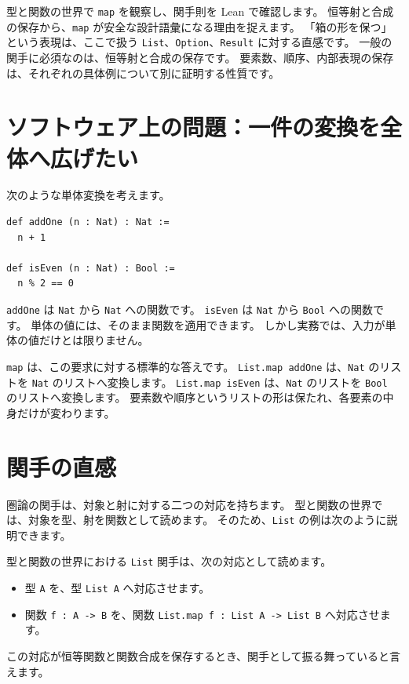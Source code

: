 型と関数の世界で \texttt{map} を観察し、関手則を Lean で確認します。
恒等射と合成の保存から、\texttt{map} が安全な設計語彙になる理由を捉えます。
「箱の形を保つ」という表現は、ここで扱う \texttt{List}、\texttt{Option}、\texttt{Result} に対する直感です。
一般の関手に必須なのは、恒等射と合成の保存です。
要素数、順序、内部表現の保存は、それぞれの具体例について別に証明する性質です。

\section{ソフトウェア上の問題：一件の変換を全体へ広げたい}

次のような単体変換を考えます。

\begin{listing}[htbp]
\begin{verbatim}
def addOne (n : Nat) : Nat :=
  n + 1

def isEven (n : Nat) : Bool :=
  n % 2 == 0
\end{verbatim}
\caption{\texttt{addOne} と \texttt{isEven}}
\label{lst:ch14_single_functions}
\end{listing}

\texttt{addOne} は \texttt{Nat} から \texttt{Nat} への関数です。
\texttt{isEven} は \texttt{Nat} から \texttt{Bool} への関数です。
単体の値には、そのまま関数を適用できます。
しかし実務では、入力が単体の値だけとは限りません。

\texttt{map} は、この要求に対する標準的な答えです。
\texttt{List.map addOne} は、\texttt{Nat} のリストを \texttt{Nat} のリストへ変換します。
\texttt{List.map isEven} は、\texttt{Nat} のリストを \texttt{Bool} のリストへ変換します。
要素数や順序というリストの形は保たれ、各要素の中身だけが変わります。

\section{関手の直感}

圏論の関手は、対象と射に対する二つの対応を持ちます。
型と関数の世界では、対象を型、射を関数として読めます。
そのため、\texttt{List} の例は次のように説明できます。

型と関数の世界における \texttt{List} 関手は、次の対応として読めます。
\begin{itemize}
\item 型 \texttt{A} を、型 \texttt{List A} へ対応させます。
\item 関数 \texttt{f : A -> B} を、関数 \texttt{List.map f : List A -> List B} へ対応させます。
\end{itemize}
この対応が恒等関数と関数合成を保存するとき、関手として振る舞っていると言えます。

